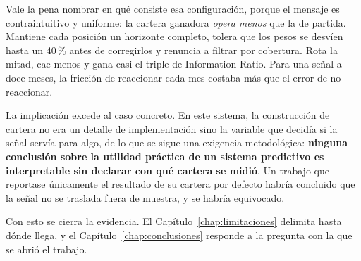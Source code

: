 Vale la pena nombrar en qué consiste esa configuración, porque el mensaje es contraintuitivo y
uniforme: la cartera ganadora \emph{opera menos} que la de partida. Mantiene cada posición un
horizonte completo, tolera que los pesos se desvíen hasta un 40\,\% antes de corregirlos y renuncia
a filtrar por cobertura. Rota la mitad, cae menos y gana casi el triple de Information Ratio. Para
una señal a doce meses, la fricción de reaccionar cada mes costaba más que el error de no reaccionar.

La implicación excede al caso concreto. En este sistema, la construcción de cartera no era un
detalle de implementación sino la variable que decidía si la señal servía para algo, de lo que se
sigue una exigencia metodológica: \textbf{ninguna conclusión sobre la utilidad práctica de un
sistema predictivo es interpretable sin declarar con qué cartera se midió}. Un trabajo que reportase
únicamente el resultado de su cartera por defecto habría concluido que la señal no se traslada fuera
de muestra, y se habría equivocado.

Con esto se cierra la evidencia. El Capítulo~\ref{chap:limitaciones} delimita hasta dónde llega, y
el Capítulo~\ref{chap:conclusiones} responde a la pregunta con la que se abrió el trabajo.
